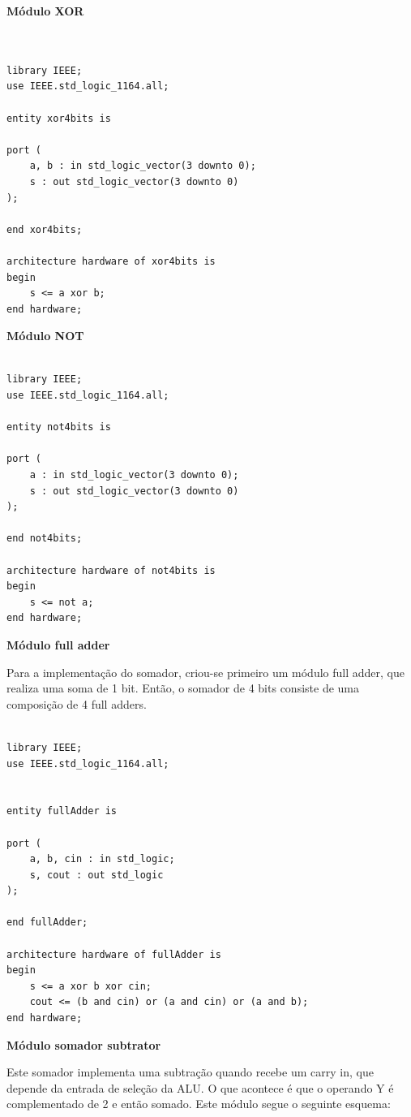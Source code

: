 \documentclass{article}
\begin{document}
\textbf{Módulo XOR}

\begin{verbatim}


library IEEE;
use IEEE.std_logic_1164.all;

entity xor4bits is

port ( 
	a, b : in std_logic_vector(3 downto 0);
	s : out std_logic_vector(3 downto 0)
);

end xor4bits;

architecture hardware of xor4bits is
begin
	s <= a xor b;
end hardware;

\end{verbatim}

\textbf{Módulo NOT}

\begin{verbatim}

library IEEE;
use IEEE.std_logic_1164.all;

entity not4bits is

port (
	a : in std_logic_vector(3 downto 0);
	s : out std_logic_vector(3 downto 0)
);

end not4bits;

architecture hardware of not4bits is
begin
	s <= not a;
end hardware;

\end{verbatim}

\textbf{Módulo full adder}
\newline

Para a implementação do somador, criou-se primeiro um módulo full adder, que
realiza uma soma de 1 bit. Então, o somador de 4 bits consiste de uma 
composição de 4 full adders.

\begin{verbatim}

library IEEE;
use IEEE.std_logic_1164.all;


entity fullAdder is

port (
	a, b, cin : in std_logic;
	s, cout : out std_logic
);

end fullAdder;

architecture hardware of fullAdder is
begin
	s <= a xor b xor cin;
	cout <= (b and cin) or (a and cin) or (a and b);
end hardware;

\end{verbatim}

\textbf{Módulo somador subtrator}
\newline

Este somador implementa uma subtração quando recebe um carry in, que depende
da entrada de seleção da ALU. O que acontece é que o operando Y é complementado
de 2 e então somado. Este módulo segue o seguinte esquema: 
\end{document}
